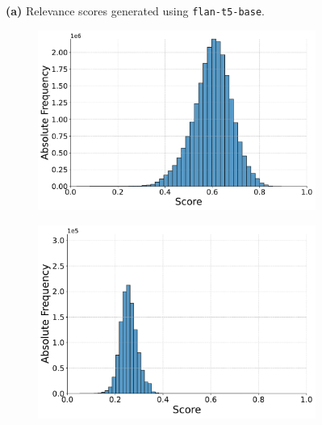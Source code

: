 \begin{figure}[ht!]
    \vspace{-0.5cm}
    \textbf{(a)} Relevance scores generated using \texttt{flan-t5-base}.
    \vspace{0.5cm}

    \begin{subfigure}[b]{0.49\textwidth}
        \centering
        \includegraphics[width=\textwidth]{graphics/seaborn/pairwise_self_score_distribution_flan-t5-small.pdf}
        \label{fig:pairwise_flan-t5-small}
    \end{subfigure}
    \hfill
    \begin{subfigure}[b]{0.49\textwidth}
        \centering
        \includegraphics[width=\textwidth]{graphics/seaborn/pointwise_self_score_distribution_flan-t5-small.pdf}
        \label{fig:pointwise_flan-t5-small}
    \end{subfigure}


\end{figure}
